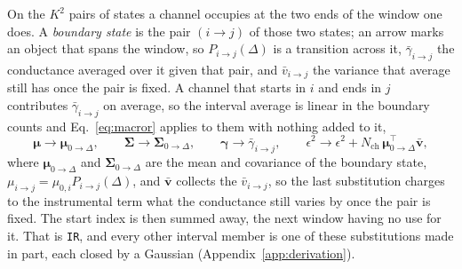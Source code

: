 On the $K^2$ pairs of states a channel occupies at the two ends of the window one does. A
\emph{boundary state} is the pair $(i\to j)$ of those two states; an arrow marks an object that
spans the window, so $P_{i\to j}(\Delta)$ is a transition across it, $\bar{\gamma}_{i\to j}$ the
conductance averaged over it given that pair, and $\bar{v}_{i\to j}$ the variance that average
still has once the pair is fixed. A channel that starts in $i$ and ends in $j$ contributes
$\bar{\gamma}_{i\to j}$ on average, so the interval average is linear in the boundary counts and
Eq.~\ref{eq:macror} applies to them with nothing added to it,
\begin{equation}
  \boldsymbol{\mu} \to \boldsymbol{\mu}_{0\to\Delta},
  \qquad
  \boldsymbol{\Sigma} \to \boldsymbol{\Sigma}_{0\to\Delta},
  \qquad
  \boldsymbol{\gamma} \to \bar{\gamma}_{i\to j},
  \qquad
  \epsilon^2 \to \epsilon^2 + N_{\mathrm{ch}}\,\boldsymbol{\mu}_{0\to\Delta}^\top\bar{\boldsymbol{v}},
  \label{eq:macroir}
\end{equation}
where $\boldsymbol{\mu}_{0\to\Delta}$ and $\boldsymbol{\Sigma}_{0\to\Delta}$ are the mean and covariance of the
boundary state, $\mu_{i\to j}=\mu_{0,i}P_{i\to j}(\Delta)$, and $\bar{\boldsymbol{v}}$ collects the
$\bar{v}_{i\to j}$, so the last substitution charges to the instrumental term what the
conductance still varies by once the pair is fixed. The start index
is then summed away, the next window having no use for it. That is \texttt{IR}, and every other
interval member is one of these substitutions made in part, each closed by a Gaussian
(Appendix~\ref{app:derivation}).


